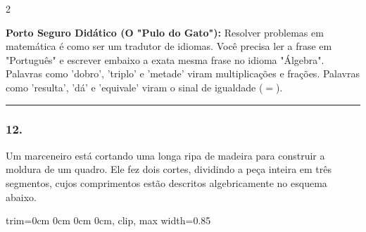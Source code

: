 \begin{multicols*}{2}
    \begin{boxexplicacao}
    \textbf{Porto Seguro Didático (O "Pulo do Gato"):} Resolver problemas em matemática é como ser um tradutor de idiomas. Você precisa ler a frase em "Português" e escrever embaixo a exata mesma frase no idioma "Álgebra". Palavras como 'dobro', 'triplo' e 'metade' viram multiplicações e frações. Palavras como 'resulta', 'dá' e 'equivale' viram o sinal de igualdade ($=$).
    \end{boxexplicacao}
\fi

\par\vspace{\espacoQuestao}


\noindent\textcolor{CorLinha}{\rule{\linewidth}{0.5pt}} 
\par\vspace{\espacoPreQuestao}
\subsubsection*{12.} 
\begin{enunciadoLiteral}
Um marceneiro está cortando uma longa ripa de madeira para construir a moldura de um quadro. Ele fez dois cortes, dividindo a peça inteira em três segmentos, cujos comprimentos estão descritos algebricamente no esquema abaixo.

\begin{center}
\begin{adjustbox}{trim=0cm 0cm 0cm 0cm, clip, max width=0.85\linewidth}
\end{adjustbox}
\end{center}
\end{enunciadoLiteral}
\end{multicols*}
